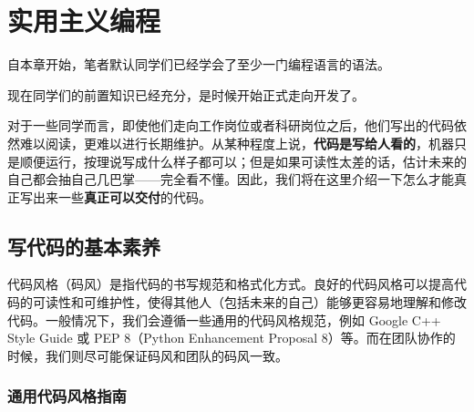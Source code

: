 \documentclass[../main.tex]{subfiles}
\begin{document}
\chapter{实用主义编程}

\begin{flushright}
  { \kaishu 自本章开始，笔者默认同学们已经学会了至少一门编程语言的语法。}
\end{flushright}

现在同学们的前置知识已经充分，是时候开始正式走向开发了。

对于一些同学而言，即使他们走向工作岗位或者科研岗位之后，他们写出的代码依然难以阅读，更难以进行长期维护。从某种程度上说，\textbf{代码是写给人看的}，机器只是顺便运行，按理说写成什么样子都可以；但是如果可读性太差的话，估计未来的自己都会抽自己几巴掌——完全看不懂。因此，我们将在这里介绍一下怎么才能真正写出来一些\textbf{真正可以交付}的代码。

\section{写代码的基本素养}\label{sec:code-style}

代码风格（码风）是指代码的书写规范和格式化方式。良好的代码风格可以提高代码的可读性和可维护性，使得其他人（包括未来的自己）能够更容易地理解和修改代码。一般情况下，我们会遵循一些通用的代码风格规范，例如 Google C++ Style Guide 或 PEP 8（Python Enhancement Proposal 8）等。而在团队协作的时候，我们则尽可能保证码风和团队的码风一致。

\subsection{通用代码风格指南}
\end{document}
